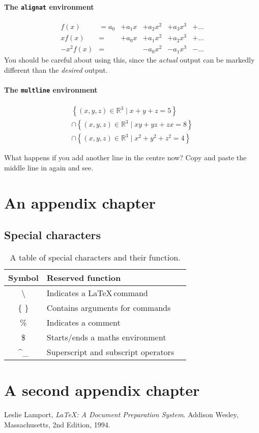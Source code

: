 \documentclass[a4paper,oneside]{book}
\begin{document}
\subsubsection{The \texttt{alignat} environment}

\begin{alignat}{6}
f(x)
  &= a_0 &+ a_1 x &+ a_2 x^2 &+ a_3 x^3 &+ \ldots \\
x f(x)
  &=     &+ a_0 x &+ a_1 x^2 &+ a_2 x^3 &+ \ldots \\
-x^2 f(x)
  &=     &        &- a_0 x^2 &- a_1 x^3 &- \ldots 
\end{alignat}
You should be careful about using this, since the \textit{actual} output can be markedly different than the \textit{desired} output.


\subsubsection{The \texttt{multline} environment}

\begin{multline}
  \left\{ (x,y,z) \in \mathbb{R}^3 \mid x + y + z = 5 \right\} \\
  \cap \left\{ (x,y,z) \in \mathbb{R}^3 \mid xy + yz + zx = 8 \right\} \\
  \cap \left\{ (x,y,z) \in \mathbb{R}^3 \mid x^2 + y^2 + z^2 = 4 \right\}
\end{multline}

What happens if you add another line in the centre now?
Copy and paste the middle line in again and see.


\appendix
\chapter{An appendix chapter}

\section{Special characters}

\begin{table}[h]
\begin{tabular}{c | l | c}
Symbol & Reserved function  &\\\hline
\textbackslash & Indicates a \LaTeX\,command\\[6pt]
\{ \quad \} & Contains arguments for commands \\[6pt]
\% & Indicates a comment \\[6pt]
\$ & Starts/ends a maths environment \\[6pt]
\textasciicircum \quad \_ & Superscript and subscript operators
\end{tabular}
\caption{A table of special characters and their function.}
\end{table}



\chapter{A second appendix chapter}



\begin{thebibliography}{xx}

	  Leslie Lamport,
	  \emph{\LaTeX: A Document Preparation System}.
	  Addison Wesley, Massachusetts,
	  2nd Edition,
	  1994.

\end{thebibliography}
\end{document}
